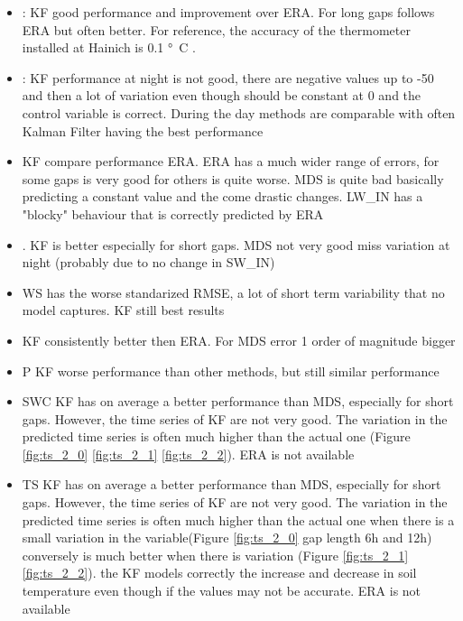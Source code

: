 \documentclass{article}
\begin{document}
\begin{itemize}
    \item {}: KF good performance and improvement over ERA. For long gaps follows ERA but often better. For reference, the accuracy of the thermometer installed at Hainich \cite{noauthor_associated_2020} is 0.1 \si{°C} \cite{noauthor_specification_nodate}.
    \item {}: KF performance at night is not good, there are negative values up to -50 and then a lot of variation even though should be constant at 0 and the control variable is correct. During the day methods are comparable with often Kalman Filter having the best performance 
    \item {} KF compare performance ERA. ERA has a much wider range of errors, for some gaps is very good for others is quite worse. MDS is quite bad basically predicting a constant value and the come drastic changes. LW\_IN has a "blocky" behaviour that is correctly predicted by ERA
    \item {}. KF is better especially for short gaps. MDS not very good miss variation at night (probably due to no change in SW\_IN)
    \item WS has the worse standarized RMSE, a lot of short term variability that no model captures. KF still best results 
    \item {} KF consistently better then ERA. For MDS error 1 order of magnitude bigger
    \item P KF worse performance than other methods, but still similar performance
    \item SWC KF has on average a better performance than MDS, especially for short gaps. However, the time series of KF are not very good. The variation in the predicted time series is often much higher than the actual one (Figure \ref{fig:ts_2_0} \ref{fig:ts_2_1} \ref{fig:ts_2_2}). ERA is not available
    \item TS KF has on average a better performance than MDS, especially for short gaps. However, the time series of KF are not very good. The variation in the predicted time series is often much higher than the actual one when there is a small variation in the variable(Figure \ref{fig:ts_2_0} gap length 6h and 12h) conversely is much better when there is variation (Figure \ref{fig:ts_2_1} \ref{fig:ts_2_2}). the KF models correctly the increase and decrease in soil temperature even though if the values may not be accurate. ERA is not available
    
\end{itemize}
\end{document}
